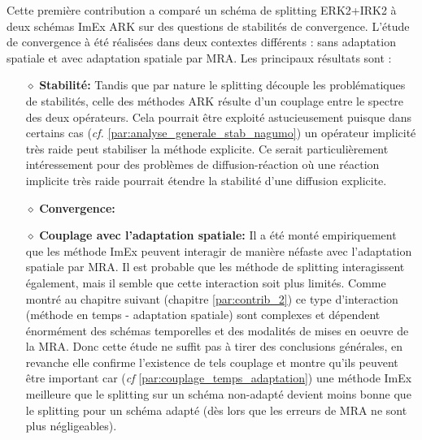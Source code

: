Cette première contribution a comparé un schéma de splitting ERK2+IRK2 à deux schémas ImEx ARK sur des questions de stabilités de convergence. 
L'étude de convergence à été réalisées dans deux contextes différents : sans adaptation spatiale et avec adaptation spatiale par MRA.
Les principaux résultats sont : 
\begin{itemize}
    \item[$\diamond$] \textbf{Stabilité:} Tandis que par nature le splitting 
    découple les problématiques de stabilités, celle des méthodes ARK résulte d'un couplage entre le spectre des deux opérateurs.  
    Cela pourrait être exploité astucieusement puisque dans certains cas (\textit{cf.} \ref{par:analyse_generale_stab_nagumo})
    un opérateur implicité très raide peut stabiliser la méthode explicite. Ce serait particulièrement intéressement pour des problèmes de diffusion-réaction
    où une réaction implicite très raide pourrait étendre la stabilité d'une diffusion explicite.
    \item[$\diamond$] \textbf{Convergence:} 
    \item[$\diamond$] \textbf{Couplage avec l'adaptation spatiale:} Il a été monté empiriquement
    que les méthode ImEx peuvent interagir de manière néfaste avec l'adaptation spatiale par MRA.
    Il est probable que les méthode de splitting interagissent également, mais il semble que cette interaction soit plus limités.
    Comme montré au chapitre suivant (chapitre \ref{par:contrib_2}) ce type d’interaction (méthode en temps - adaptation spatiale)
    sont complexes et dépendent énormément des schémas temporelles et des modalités de mises en oeuvre de la MRA. 
    Donc cette étude ne suffit pas à tirer des conclusions générales,
    en revanche elle confirme l'existence de tels couplage et montre qu'ils peuvent être important car  (\textit{cf} \ref{par:couplage_temps_adaptation}) une méthode ImEx meilleure que le splitting sur un schéma non-adapté 
    devient moins bonne que le splitting pour un schéma adapté (dès lors que les erreurs de MRA ne sont plus négligeables).
\end{itemize}